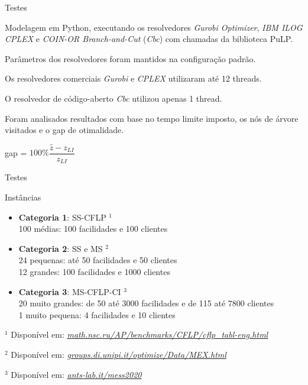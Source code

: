 \documentclass[aspectratio=169]{beamer}
\newcommand{ \solver }[1]{\textit{#1}}
\begin{document}
	
	\begin{frame}{Testes}
		
		Modelagem em Python, 
		executando os resolvedores 
		\solver{Gurobi Optimizer}, 
		\solver{IBM ILOG CPLEX} e 
		\solver{COIN-OR Branch-and-Cut} (\solver{Cbc})
		com chamadas da biblioteca PuLP.
		
		\hfill
		
		Parâmetros dos resolvedores foram mantidos na configuração padrão.
		
		\hfill
		
		Os resolvedores comerciais \solver{Gurobi} e \solver{CPLEX} utilizaram até 12 threads.
		
		O resolvedor de código-aberto \solver{Cbc} utilizou apenas 1 thread.
		
		\hfill
		
		Foram analisados resultados com base no tempo limite imposto, os nós de árvore visitados e o gap de otimalidade.
		
		
		\qquad \hfill 
			gap = $100\% \dfrac{\hat{z} - z_{LI}}{z_{LI}}$ 
		\hfill \qquad 
	
	\end{frame}
	
	
	\begin{frame}{Testes}			
		
		\begin{exampleblock}{Instâncias}
			\begin{itemize}
				\item \textbf{Categoria 1}: 
					SS-CFLP \cite{Sobolev}$^1$
					\\ 100 médias: 100 facilidades e 100 clientes
					
					
				\item \textbf{Categoria 2}: 
					SS e MS \cite{Beasley}$^2$
					\\ 24 pequenas: até 50 facilidades e 50 clientes   
					\\ 12 grandes: 100 facilidades e 1000 clientes  
	
				\item \textbf{Categoria 3}:  
					MS-CFLP-CI \cite{Maia}$^3$
					\\ 20 muito grandes: de 50 até 3000 facilidades e de 115 até 7800 clientes 
					\\ 1 muito pequena: 4 facilidades e 10 clientes
			\end{itemize}
		
			
		\end{exampleblock}

		$^1$ Disponível em: \href{http://old.math.nsc.ru/AP/benchmarks/CFLP/cflp_tabl-eng.html}{\textit{math.nsc.ru/AP/benchmarks/CFLP/cflp\_tabl-eng.html}}

		$^2$ Disponível em: \href{http://groups.di.unipi.it/optimize/Data/MEX.html}{\textit{groups.di.unipi.it/optimize/Data/MEX.html}}

		$^3$ Disponível em: \href{https://www.ants-lab.it/mess2020/\#competition}{\textit{ants-lab.it/mess2020}}
		
	\end{frame}
\end{document}
